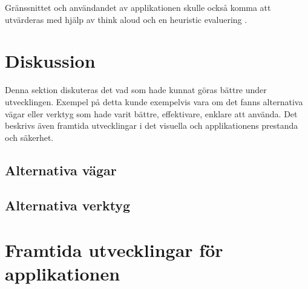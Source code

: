 \documentclass[a4paper, 11pt]{article}
\begin{document}
Gränssnittet och användandet av applikationen skulle också komma att utvärderas med hjälp av think aloud \cite{thinkaloud} och en heuristic evaluering \cite{heruistic}.

\section{Diskussion}
Denna sektion diskuteras det vad som hade kunnat göras bättre under utvecklingen. Exempel på detta kunde exempelvis vara om det fanns alternativa vägar eller verktyg som hade varit bättre, effektivare, enklare att använda. Det beskrivs även framtida utvecklingar i det visuella och applikationens prestanda och säkerhet.

\subsection{Alternativa vägar}

\subsection{Alternativa verktyg}

\section{Framtida utvecklingar för applikationen}



\newpage
\printbibliography[title={Referenser}]
\end{document}
